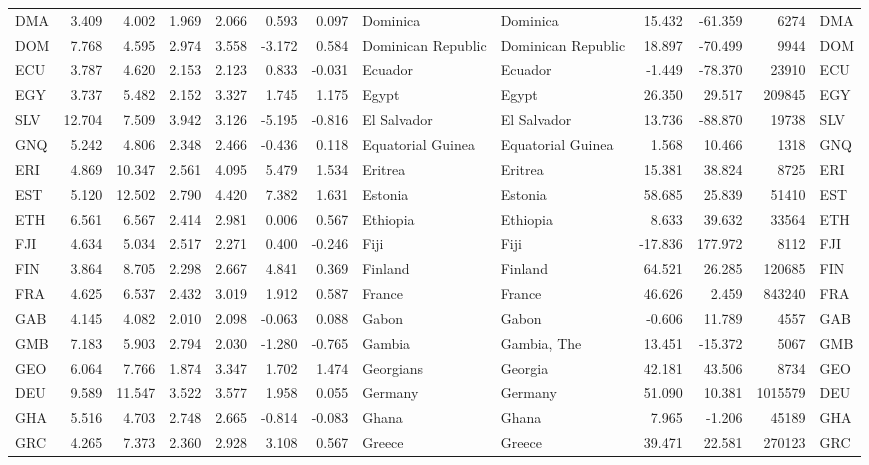 \begin{tabular}{lrrrrrrllrrrl}
DMA & 3.409 & 4.002 & 1.969 & 2.066 & 0.593 & 0.097 & Dominica & Dominica & 15.432 & -61.359 & 6274 & DMA \\
DOM & 7.768 & 4.595 & 2.974 & 3.558 & -3.172 & 0.584 & Dominican Republic & Dominican Republic & 18.897 & -70.499 & 9944 & DOM \\
ECU & 3.787 & 4.620 & 2.153 & 2.123 & 0.833 & -0.031 & Ecuador & Ecuador & -1.449 & -78.370 & 23910 & ECU \\
EGY & 3.737 & 5.482 & 2.152 & 3.327 & 1.745 & 1.175 & Egypt & Egypt & 26.350 & 29.517 & 209845 & EGY \\
SLV & 12.704 & 7.509 & 3.942 & 3.126 & -5.195 & -0.816 & El Salvador & El Salvador & 13.736 & -88.870 & 19738 & SLV \\
GNQ & 5.242 & 4.806 & 2.348 & 2.466 & -0.436 & 0.118 & Equatorial Guinea & Equatorial Guinea & 1.568 & 10.466 & 1318 & GNQ \\
ERI & 4.869 & 10.347 & 2.561 & 4.095 & 5.479 & 1.534 & Eritrea & Eritrea & 15.381 & 38.824 & 8725 & ERI \\
EST & 5.120 & 12.502 & 2.790 & 4.420 & 7.382 & 1.631 & Estonia & Estonia & 58.685 & 25.839 & 51410 & EST \\
ETH & 6.561 & 6.567 & 2.414 & 2.981 & 0.006 & 0.567 & Ethiopia & Ethiopia & 8.633 & 39.632 & 33564 & ETH \\
FJI & 4.634 & 5.034 & 2.517 & 2.271 & 0.400 & -0.246 & Fiji & Fiji & -17.836 & 177.972 & 8112 & FJI \\
FIN & 3.864 & 8.705 & 2.298 & 2.667 & 4.841 & 0.369 & Finland & Finland & 64.521 & 26.285 & 120685 & FIN \\
FRA & 4.625 & 6.537 & 2.432 & 3.019 & 1.912 & 0.587 & France & France & 46.626 & 2.459 & 843240 & FRA \\
GAB & 4.145 & 4.082 & 2.010 & 2.098 & -0.063 & 0.088 & Gabon & Gabon & -0.606 & 11.789 & 4557 & GAB \\
GMB & 7.183 & 5.903 & 2.794 & 2.030 & -1.280 & -0.765 & Gambia & Gambia, The & 13.451 & -15.372 & 5067 & GMB \\
GEO & 6.064 & 7.766 & 1.874 & 3.347 & 1.702 & 1.474 & Georgians & Georgia & 42.181 & 43.506 & 8734 & GEO \\
DEU & 9.589 & 11.547 & 3.522 & 3.577 & 1.958 & 0.055 & Germany & Germany & 51.090 & 10.381 & 1015579 & DEU \\
GHA & 5.516 & 4.703 & 2.748 & 2.665 & -0.814 & -0.083 & Ghana & Ghana & 7.965 & -1.206 & 45189 & GHA \\
GRC & 4.265 & 7.373 & 2.360 & 2.928 & 3.108 & 0.567 & Greece & Greece & 39.471 & 22.581 & 270123 & GRC \\

\end{tabular}
